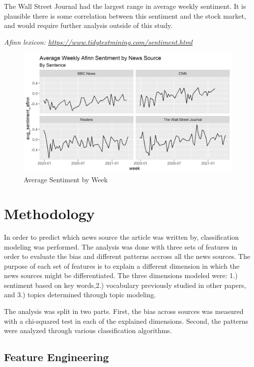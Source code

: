 \documentclass[
]{article}
\begin{document}
The Wall Street Journal had the largest range in average weekly
sentiment. It is plausible there is some correlation between this
sentiment and the stock market, and would require further analysis
outside of this study.

\emph{Afinn lexicon:
\url{https://www.tidytextmining.com/sentiment.html}}

\begin{figure}
\centering
\includegraphics{../figures/sentence_afinn_sentiment_week.png}
\caption{Average Sentiment by Week}
\end{figure}

\hypertarget{methodology}{%
\section{Methodology}\label{methodology}}

In order to predict which news source the article was written by,
classification modeling was performed. The analysis was done with three
sets of features in order to evaluate the bias and different patterns
accross all the news sources. The purpose of each set of features is to
explain a different dimension in which the news sources might be
differentiated. The three dimensions modeled were: 1.) sentiment based
on key words,2.) vocabulary previously studied in other papers, and 3.)
topics determined through topic modeling.

The analysis was split in two parts. First, the bias across sources was
measured with a chi-squared test in each of the explained dimensions.
Second, the patterns were analyzed through various classification
algorithms.

\hypertarget{feature-engineering}{%
\subsection{Feature Engineering}\label{feature-engineering}}
\end{document}
